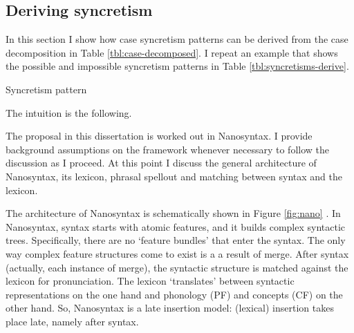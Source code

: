 

\subsection{Deriving syncretism}

In this section I show how case syncretism patterns can be derived from the case decomposition in Table \ref{tbl:case-decomposed}. I repeat an example that shows the possible and impossible syncretism patterns in Table \ref{tbl:syncretisms-derive}.

\begin{table}[ht]
  \center
  \caption {Syncretism pattern}
    
  \label{tbl:syncretisms-derive}
\end{table}

The intuition is the following.



The proposal in this dissertation is worked out in Nanosyntax. I provide background assumptions on the framework whenever necessary to follow the discussion as I proceed. At this point I discuss the general architecture of Nanosyntax, its lexicon, phrasal spellout and matching between syntax and the lexicon.

The architecture of Nanosyntax is schematically shown in Figure \ref{fig:nano} \citep[from][]{vandenwyngaerd2020,caha2019}. In Nanosyntax, syntax starts with atomic features, and it builds complex syntactic trees. Specifically, there are no `feature bundles' that enter the syntax. The only way complex feature structures come to exist is a a result of merge.
After syntax (actually, each instance of merge), the syntactic structure is matched against the lexicon for pronunciation. The lexicon `translates' between syntactic representations on the one hand and phonology (PF) and concepts (CF) on the other hand. So, Nanosyntax is a late insertion model: (lexical) insertion takes place late, namely after syntax.

